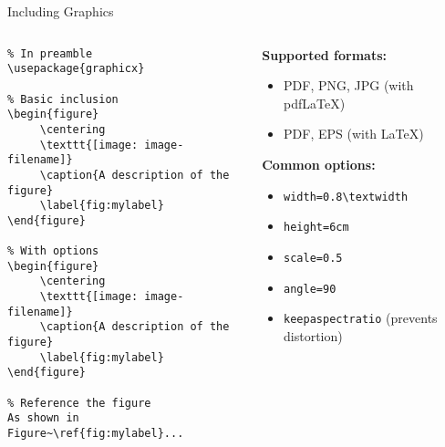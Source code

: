 \begin{frame}[fragile]{Including Graphics}
     \begin{columns}
          \begin{column}{0.5\textwidth}
               \begin{lstlisting}
% In preamble
\usepackage{graphicx}

% Basic inclusion
\begin{figure}
     \centering
     \texttt{[image: image-filename]}
     \caption{A description of the figure}
     \label{fig:mylabel}
\end{figure}

% With options
\begin{figure}
     \centering
     \texttt{[image: image-filename]}
     \caption{A description of the figure}
     \label{fig:mylabel}
\end{figure}

% Reference the figure
As shown in Figure~\ref{fig:mylabel}...
               \end{lstlisting}
          \end{column}
          
          \begin{column}{0.5\textwidth}
               \textbf{Supported formats:}
               \begin{itemize}
                    \item PDF, PNG, JPG (with pdfLaTeX)
                    \item PDF, EPS (with LaTeX)
               \end{itemize}
               
               \textbf{Common options:}
               \begin{itemize}
                    \item \texttt{width=0.8\textbackslash textwidth}
                    \item \texttt{height=6cm}
                    \item \texttt{scale=0.5}
                    \item \texttt{angle=90}
                    \item \texttt{keepaspectratio} (prevents distortion)
               \end{itemize}
               

\end{column}
\end{columns}
\end{frame}
